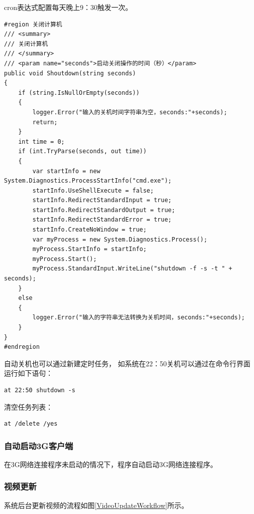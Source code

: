 \documentclass{book}
\begin{document}
cron表达式配置每天晚上9：30触发一次。

\begin{lstlisting}
#region 关闭计算机
/// <summary>
/// 关闭计算机
/// </summary>
/// <param name="seconds">启动关闭操作的时间（秒）</param>
public void Shoutdown(string seconds)
{
	if (string.IsNullOrEmpty(seconds))
	{
		logger.Error("输入的关机时间字符串为空，seconds:"+seconds);
		return;
	}
	int time = 0;
	if (int.TryParse(seconds, out time))
	{
		var startInfo = new System.Diagnostics.ProcessStartInfo("cmd.exe");
		startInfo.UseShellExecute = false;
		startInfo.RedirectStandardInput = true;
		startInfo.RedirectStandardOutput = true;
		startInfo.RedirectStandardError = true;
		startInfo.CreateNoWindow = true;
		var myProcess = new System.Diagnostics.Process();
		myProcess.StartInfo = startInfo;
		myProcess.Start();
		myProcess.StandardInput.WriteLine("shutdown -f -s -t " + seconds);
	}
	else
	{
		logger.Error("输入的字符串无法转换为关机时间，seconds:"+seconds);
	}
}
#endregion
\end{lstlisting}

自动关机也可以通过新建定时任务，
如系统在22：50关机可以通过在命令行界面运行如下语句：

\begin{lstlisting}
at 22:50 shutdown -s
\end{lstlisting}

清空任务列表：

\begin{lstlisting}
at /delete /yes
\end{lstlisting}

\subsubsection{自动启动3G客户端}

在3G网络连接程序未启动的情况下，程序自动启动3G网络连接程序。

\subsubsection{视频更新}
\label{sec:VideoUpdate}

系统后台更新视频的流程如图\ref{VideoUpdateWorkflow}所示。
\end{document}
